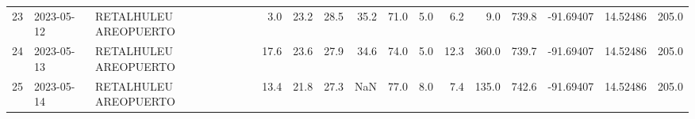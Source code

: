 \documentclass[12pt]{article}
\begin{document}
\begin{center}
\begin{tabular}{lllrrrrrrrrrrrr}
23  & 2023-05-12 &  RETALHULEU AREOPUERTO &     3.0 &  23.2 &   28.5 &  35.2 &     71.0 &  5.0 &         6.2 &         9.0 &      739.8 & -91.69407 &  14.52486 &    205.0 \\
24  & 2023-05-13 &  RETALHULEU AREOPUERTO &    17.6 &  23.6 &   27.9 &  34.6 &     74.0 &  5.0 &        12.3 &       360.0 &      739.7 & -91.69407 &  14.52486 &    205.0 \\
25  & 2023-05-14 &  RETALHULEU AREOPUERTO &    13.4 &  21.8 &   27.3 &   NaN &     77.0 &  8.0 &         7.4 &       135.0 &      742.6 & -91.69407 &  14.52486 &    205.0 \\
\bottomrule
\end{tabular}

        
        \end{center}
        
\end{document}
